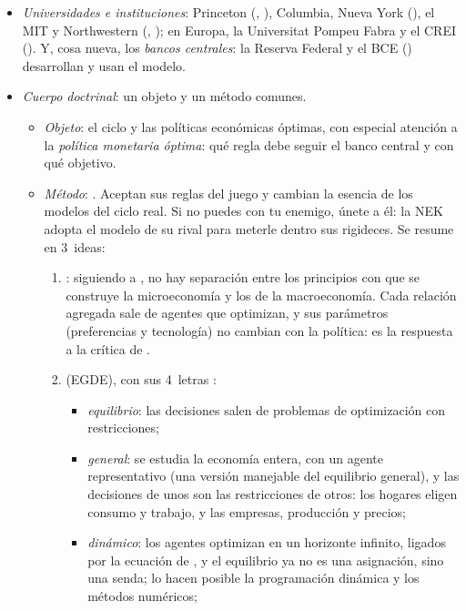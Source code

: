 \documentclass[11pt]{article}
\begin{document}
\begin{itemize}
\begin{itemize}
  \item \emph{Universidades e instituciones}: Princeton (, ), Columbia, Nueva York (), el MIT y Northwestern (, ); en Europa, la Universitat Pompeu Fabra y el CREI (). Y, cosa nueva, los \emph{bancos centrales}: la Reserva Federal y el BCE () desarrollan y usan el modelo.
  \item \emph{Cuerpo doctrinal}: un objeto y un método comunes.
    \begin{itemize}
    \item \emph{Objeto}: el ciclo y las políticas económicas óptimas, con especial atención a la \emph{política monetaria óptima}: qué regla debe seguir el banco central y con qué objetivo.
    \item \emph{Método}: . Aceptan sus reglas del juego y cambian la esencia de los modelos del ciclo real. Si no puedes con tu enemigo, únete a él: la NEK adopta el modelo de su rival para meterle dentro sus rigideces. Se resume en 3~ideas:
      \begin{enumerate}
      \item {}: siguiendo a , no hay separación entre los principios con que se construye la microeconomía y los de la macroeconomía. Cada relación agregada sale de agentes que optimizan, y sus parámetros (preferencias y tecnología) no cambian con la política: es la respuesta a la crítica de  .
      \item {} (EGDE), con sus 4~letras :
        \begin{itemize}
        \item \emph{equilibrio}: las decisiones salen de problemas de optimización con restricciones;
        \item \emph{general}: se estudia la economía entera, con un agente representativo (una versión manejable del equilibrio general), y las decisiones de unos son las restricciones de otros: los hogares eligen consumo y trabajo, y las empresas, producción y precios;
        \item \emph{dinámico}: los agentes optimizan en un horizonte infinito, ligados por la ecuación de  , y el equilibrio ya no es una asignación, sino una senda; lo hacen posible la programación dinámica y los métodos numéricos;

\end{itemize}
\end{enumerate}
\end{itemize}
\end{itemize}
\end{itemize}
\end{document}
